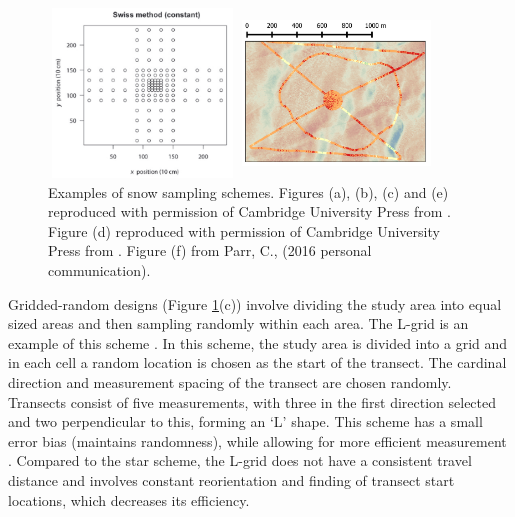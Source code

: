 \documentclass{sfuthesis}
\begin{document}
\begin{figure}[t]
\begin{minipage}[c][11cm][t]{.33\textwidth}
\end{minipage}%
\begin{minipage}[c][11cm][t]{.33\textwidth}
        \vspace*{\fill}
  \centering
    \includegraphics[width=5cm,height=4.5cm]{swiss.png}
   \par\vfill
   \includegraphics[width=5cm,height=4.5cm]{hourglass.png}
\end{minipage}
\caption[Examples of snow sampling schemes]{Examples of snow sampling schemes. Figures (a), (b), (c) and (e) reproduced with permission of Cambridge University Press from \cite{Shea2010}. Figure (d) reproduced with permission of Cambridge University Press from \cite{Schweizer2008}. Figure (f) from Parr, C., (2016 personal communication).}
\label{schemes}
\end{figure}

Gridded-random designs (Figure \ref{schemes}(c)) involve dividing the study area into equal sized areas and then sampling randomly within each area. The L-grid is an example of this scheme \citep{Bellaire2008, Elder2009, Bellaire2011}. In this scheme, the study area is divided into a grid and in each cell a random location is chosen as the start of the transect. The cardinal direction and measurement spacing of the transect are chosen randomly. Transects consist of five measurements, with three in the first direction selected and two perpendicular to this, forming an `L' shape. This scheme has a small error bias (maintains randomness), while allowing for more efficient measurement \citep{Shea2010}. Compared to the star scheme, the L-grid does not have a consistent travel distance and involves constant reorientation and finding of transect start locations, which decreases its efficiency. 
\end{document}
